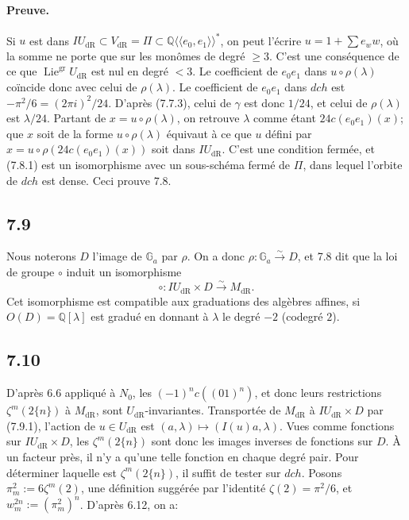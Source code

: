 \documentclass[10pt]{article}
\newcommand{\Q}{\mathbb Q}
\newcommand{\Ga}{\mathbb G_a}
\newcommand{\Lie}{\operatorname{Lie}}
\newcommand{\dR}{\mathrm{dR}}
\begin{document}
\paragraph{Preuve.}
Si $u$ est dans $IU_{\dR}\subset V_{\dR}=\Pi\subset\Q\langle\!\langle e_0,e_1\rangle\!\rangle^*$, on peut l'écrire $u=1+\sum e_w w$, où la somme ne porte que sur les monômes de degré $\geq3$. C'est une conséquence de ce que $\Lie^{\mathrm{gr}}U_{\dR}$ est nul en degré $<3$. Le coefficient de $e_0e_1$ dans $u\circ\rho(\lambda)$ coïncide donc avec celui de $\rho(\lambda)$. Le coefficient de $e_0e_1$ dans $dch$ est $-\pi^2/6=(2\pi i)^2/24$. D'après (7.7.3), celui de $\gamma$ est donc $1/24$, et celui de $\rho(\lambda)$ est $\lambda/24$. Partant de $x=u\circ\rho(\lambda)$, on retrouve $\lambda$ comme étant $24c(e_0e_1)(x)$; que $x$ soit de la forme $u\circ\rho(\lambda)$ équivaut à ce que $u$ défini par $x=u\circ\rho(24c(e_0e_1)(x))$ soit dans $IU_{\dR}$. C'est une condition fermée, et (7.8.1) est un isomorphisme avec un sous-schéma fermé de $\Pi$, dans lequel l'orbite de $dch$ est dense. Ceci prouve 7.8.

\subsection*{7.9}
Nous noterons $D$ l'image de $\Ga$ par $\rho$. On a donc $\rho:\Ga\overset{\sim}{\to}D$, et 7.8 dit que la loi de groupe $\circ$ induit un isomorphisme
\begin{equation}
\circ:IU_{\dR}\times D\overset{\sim}{\longrightarrow}M_{\dR}.
\tag{7.9.1}
\end{equation}
Cet isomorphisme est compatible aux graduations des algèbres affines, si $O(D)=\Q[\lambda]$ est gradué en donnant à $\lambda$ le degré $-2$ (codegré $2$).

\subsection*{7.10}
D'après 6.6 appliqué à $N_0$, les $(-1)^n c((01)^n)$, et donc leurs restrictions $\zeta^m(2\{n\})$ à $M_{\dR}$, sont $U_{\dR}$-invariantes. Transportée de $M_{\dR}$ à $IU_{\dR}\times D$ par (7.9.1), l'action de $u\in U_{\dR}$ est $(a,\lambda)\mapsto(I(u)a,\lambda)$. Vues comme fonctions sur $IU_{\dR}\times D$, les $\zeta^m(2\{n\})$ sont donc les images inverses de fonctions sur $D$. À un facteur près, il n'y a qu'une telle fonction en chaque degré pair. Pour déterminer laquelle est $\zeta^m(2\{n\})$, il suffit de tester sur $dch$. Posons $\pi_m^2:=6\zeta^m(2)$, une définition suggérée par l'identité $\zeta(2)=\pi^2/6$, et $w_m^{2n}:=(\pi_m^2)^n$. D'après 6.12, on a:
\end{document}
